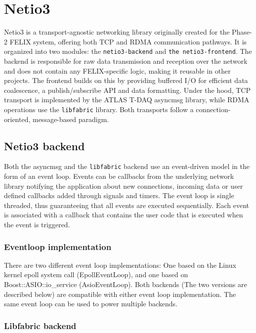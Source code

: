 \chapter{Netio3}
\label{chap:netio3}

Netio3 \cite{netio3-docs} is a transport-agnostic networking library originally created for the Phase-2 \acs{FELIX} system, offering both TCP and \acs{RDMA} communication pathways.  It is organized into two modules: the \texttt{netio3-backend} and \texttt{the netio3-frontend}.  The backend is responsible for raw data transmission and reception over the network and does not contain any \acs{FELIX}-specific logic, making it reusable in other projects. The frontend builds on this by providing buffered I/O for efficient data coalescence, a publish/subscribe API and data formatting.  Under the hood, TCP transport is implemented by the \acs{ATLAS} \acs{T-DAQ} asyncmsg library, while \acs{RDMA} operations use the \texttt{libfabric} \cite{libfabric} library.  Both transports follow a connection-oriented, message-based paradigm.

\section{Netio3 backend}

Both the asyncmsg and the \texttt{libfabric} backend use an event-driven model in the form of an event loop. Events can be callbacks from the underlying network library notifying the application about new connections, incoming data or user defined callbacks added through signals and timers. The event loop is single threaded, thus guaranteeing that all events are executed sequentially. Each event is associated with a callback that contains the user code that is executed when the event is triggered.

\subsection{Eventloop implementation}

There are two different event loop implementations: One based on the Linux kernel epoll system call (EpollEventLoop), and one based on Boost::ASIO::io\_service (AsioEventLoop). Both backends (The two versions are described below) are compatible with either event loop implementation. The same event loop can be used to power multiple backends.


\subsection{Libfabric backend}
\label{subsec:libfabric}

